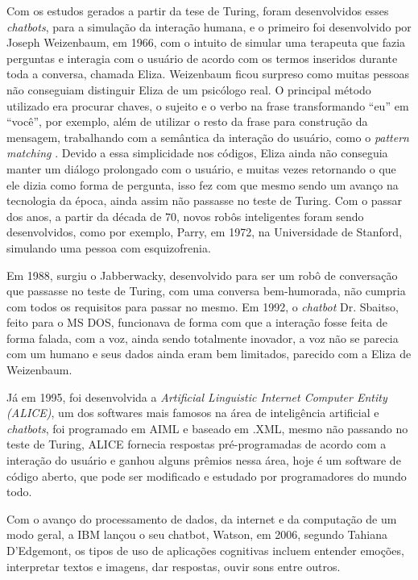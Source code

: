 \documentclass[
	12pt,				%
	oneside,
	a4paper,			%
	english,			%
	french,				%
	spanish,			%
	brazil				%
	]{abntex2}
\begin{document}
Com os estudos gerados a partir da tese de Turing, foram desenvolvidos esses \emph{chatbots}, para a simulação da interação humana, e o primeiro foi desenvolvido por Joseph Weizenbaum, em 1966, com o intuito de simular uma terapeuta que fazia perguntas e interagia com o usuário de acordo com os termos inseridos durante toda a conversa, chamada Eliza.
Weizenbaum ficou surpreso como muitas pessoas não conseguiam distinguir Eliza de um psicólogo real. 
O principal método utilizado era procurar chaves, o sujeito e o verbo na frase transformando “eu” em “você”, por exemplo, além de utilizar o resto da frase para construção da mensagem, trabalhando com a semântica da interação do usuário, como o \emph{pattern matching} \supercite{weizenbaum-eliza}. Devido a essa simplicidade nos códigos, Eliza ainda não conseguia manter um diálogo prolongado com o usuário, e muitas vezes retornando o que ele dizia como forma de pergunta, isso fez com que mesmo sendo um avanço na tecnologia da época, ainda assim não passasse no teste de Turing.
Com o passar dos anos, a partir da década de 70, novos robôs inteligentes foram sendo desenvolvidos, como por exemplo, Parry, em 1972, na Universidade de Stanford, simulando uma pessoa com esquizofrenia. 

Em 1988, surgiu o Jabberwacky, desenvolvido para ser um robô de conversação que passasse no teste de Turing, com uma conversa bem-humorada, não cumpria com todos os requisitos para passar no mesmo. 
Em 1992, o \emph{chatbot} Dr. Sbaitso, feito para o MS DOS, funcionava de forma com que a interação fosse feita de forma falada, com a voz, ainda sendo totalmente inovador, a voz não se parecia com um humano e seus dados ainda eram bem limitados, parecido com a Eliza de Weizenbaum.

Já em 1995, foi desenvolvida a \emph{Artificial Linguistic Internet Computer Entity (ALICE)}, um dos softwares mais famosos na área de inteligência artificial e \emph{chatbots}, foi programado em AIML e baseado em .XML, mesmo não passando no teste de Turing, ALICE fornecia respostas pré-programadas de acordo com a interação do usuário e ganhou alguns prêmios nessa área, hoje é um software de código aberto, que pode ser modificado e estudado por programadores do mundo todo.

Com o avanço do processamento de dados, da internet e da computação de um modo geral, a IBM lançou o seu chatbot, Watson, em 2006, segundo Tahiana D'Edgemont, os tipos de uso de aplicações cognitivas incluem entender emoções, interpretar textos e imagens, dar respostas, ouvir sons entre outros.
\end{document}
